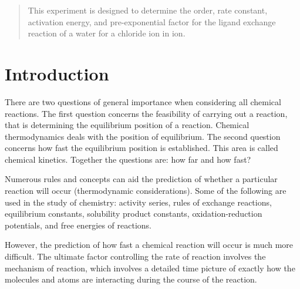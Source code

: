 \maketitle

\begin{abstract}
\noindent This experiment is designed to determine the order, rate constant, activation energy, and pre-exponential factor for the ligand exchange reaction of a water for a chloride ion in  ion.
\end{abstract}

\section{Introduction}
\label{sec:intro}
There are two questions of general importance when considering all chemical reactions. The first question concerns the feasibility of carrying out a reaction, that is determining the equilibrium position of a reaction. Chemical thermodynamics deals with the position of equilibrium. The second question concerns how fast the equilibrium position is established. This area is called chemical kinetics. Together the questions are: how far and how fast?

Numerous rules and concepts can aid the prediction of whether a particular reaction will occur (thermodynamic considerations). Some of the following are used in the study of chemistry: activity series, rules of exchange reactions, equilibrium constants, solubility product constants, oxidation-reduction potentials, and free energies of reactions.

However, the prediction of how fast a chemical reaction will occur is much more difficult. The ultimate factor controlling the rate of reaction involves the mechanism of reaction, which involves a detailed time picture of exactly how the molecules and atoms are interacting during the course of the reaction.

